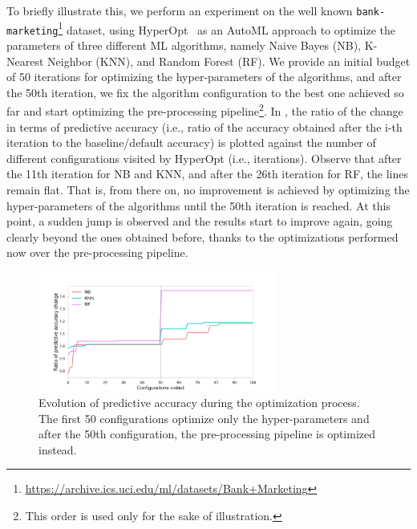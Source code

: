 To briefly illustrate this, we perform an experiment on the well known \texttt{bank-marketing}\footnote{\url{https://archive.ics.uci.edu/ml/datasets/Bank+Marketing}} dataset, using HyperOpt~\cite{HyperOptICML13} as an AutoML approach to optimize the parameters of three different ML algorithms, namely Naive Bayes (NB), K-Nearest Neighbor (KNN), and Random Forest (RF).
We provide an initial budget of 50 iterations for optimizing the hyper-parameters of the algorithms, and after the 50th iteration, we fix the algorithm configuration to the best one achieved so far and start optimizing the pre-processing pipeline\footnote{This order is used only for the sake of illustration.}.
In , the ratio of the change in terms of predictive accuracy (i.e., ratio of the accuracy obtained after the i-th iteration to the baseline/default accuracy) is plotted against the number of different configurations visited by HyperOpt (i.e., iterations).
Observe that after the 11th iteration for NB and KNN, and after the 26th iteration for RF, the lines remain flat.
That is, from there on, no improvement is achieved by optimizing the hyper-parameters of the algorithms until the 50th iteration is reached. At this point, a sudden jump is observed and the results start to improve again, going clearly beyond the ones obtained before, thanks to the optimizations performed now over the pre-processing pipeline.

\begin{figure}[t]
    \centering
    \includegraphics[width=0.7\textwidth]{chapters/data-centric/supervised/img/pre-processing-impact.pdf}
    \caption{Evolution of predictive accuracy during the optimization process. The first 50 configurations optimize only the hyper-parameters and after the 50th configuration, the pre-processing pipeline is optimized instead.}
    \label{fig:pre-processing-impact}
\end{figure}


